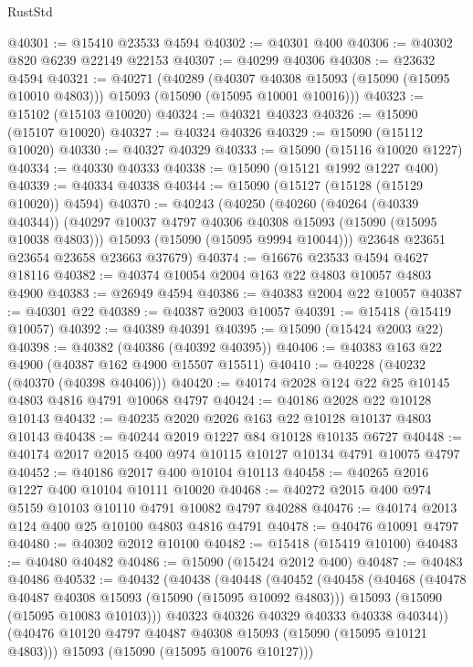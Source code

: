 \begin{lexlean}{RustStd}
\begin{coremodule}
@40301 := @15410 @23533 @4594
@40302 := @40301 @400
@40306 := @40302 @820 @6239 @22149 @22153
@40307 := @40299 @40306
@40308 := @23632 @4594
@40321 := @40271
    (@40289
      (@40307 @40308 @15093 (@15090 (@15095 @10010 @4803)))
      @15093
      (@15090 (@15095 @10001 @10016)))
@40323 := @15102 (@15103 @10020)
@40324 := @40321 @40323
@40326 := @15090 (@15107 @10020)
@40327 := @40324 @40326
@40329 := @15090 (@15112 @10020)
@40330 := @40327 @40329
@40333 := @15090 (@15116 @10020 @1227)
@40334 := @40330 @40333
@40338 := @15090 (@15121 @1992 @1227 @400)
@40339 := @40334 @40338
@40344 := @15090 (@15127 (@15128 (@15129 @10020)) @4594)
@40370 := @40243
    (@40250
      (@40260
        (@40264 (@40339 @40344))
        (@40297 @10037 @4797 @40306 @40308 @15093 (@15090 (@15095 @10038 @4803)))
        @15093
        (@15090 (@15095 @9994 @10044)))
      @23648
      @23651
      @23654
      @23658
      @23663
      @37679)
@40374 := @16676 @23533 @4594 @4627 @18116
@40382 := @40374 @10054 @2004 @163 @22 @4803 @10057 @4803 @4900
@40383 := @26949 @4594
@40386 := @40383 @2004 @22 @10057
@40387 := @40301 @22
@40389 := @40387 @2003 @10057
@40391 := @15418 (@15419 @10057)
@40392 := @40389 @40391
@40395 := @15090 (@15424 @2003 @22)
@40398 := @40382 (@40386 (@40392 @40395))
@40406 := @40383 @163 @22 @4900 (@40387 @162 @4900 @15507 @15511)
@40410 := @40228 (@40232 (@40370 (@40398 @40406)))
@40420 := @40174 @2028 @124 @22 @25 @10145 @4803 @4816 @4791 @10068 @4797
@40424 := @40186 @2028 @22 @10128 @10143
@40432 := @40235 @2020 @2026 @163 @22 @10128 @10137 @4803 @10143
@40438 := @40244 @2019 @1227 @84 @10128 @10135 @6727
@40448 := @40174 @2017 @2015 @400 @974 @10115 @10127 @10134 @4791 @10075 @4797
@40452 := @40186 @2017 @400 @10104 @10113
@40458 := @40265 @2016 @1227 @400 @10104 @10111 @10020
@40468 := @40272 @2015 @400 @974 @5159 @10103 @10110 @4791 @10082 @4797 @40288
@40476 := @40174 @2013 @124 @400 @25 @10100 @4803 @4816 @4791
@40478 := @40476 @10091 @4797
@40480 := @40302 @2012 @10100
@40482 := @15418 (@15419 @10100)
@40483 := @40480 @40482
@40486 := @15090 (@15424 @2012 @400)
@40487 := @40483 @40486
@40532 := @40432
    (@40438
      (@40448
        (@40452
          (@40458
            (@40468
              (@40478 @40487 @40308 @15093 (@15090 (@15095 @10092 @4803)))
              @15093
              (@15090 (@15095 @10083 @10103)))
            @40323
            @40326
            @40329
            @40333
            @40338
            @40344))
        (@40476 @10120 @4797 @40487 @40308 @15093 (@15090 (@15095 @10121 @4803)))
        @15093
        (@15090 (@15095 @10076 @10127)))

\end{coremodule}
\end{lexlean}
